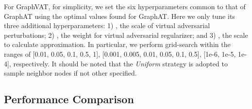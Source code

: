 \documentclass[10pt,journal,compsoc]{IEEEtran}
\begin{document}
For GraphVAT, for simplicity, we set the six hyperparameters common to that of GraphAT using the optimal values found for GraphAT. Here we only tune its three additional hyperparameters: 1) , the scale of virtual adversarial perturbations; 2) , the weight for virtual adversarial regularizer; and 3) , the scale to calculate approximation. 
In particular, we perform grid-search within the ranges of [0.01, 0.05, 0.1, 0.5, 1], [0.001, 0.005, 0.01, 0.05, 0.1, 0.5], [1e-6, 1e-5, 1e-4], respectively. It should be noted that the \textit{Uniform} strategy is adopted to sample neighbor nodes if not other specified.



\subsection{Performance Comparison}
\end{document}
